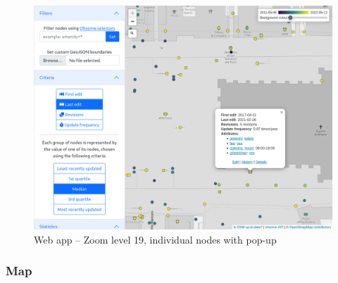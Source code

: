 \documentclass{Configuration_Files/PoliMi3i_thesis}
\begin{document}
\begin{figure}[ht]
    \centering
    \includegraphics[width=1\textwidth]{Images/level19_popup.png}
    \caption{Web app – Zoom level 19, individual nodes with pop-up}
    \label{fig:level19_popup}
\end{figure}

\subsubsection{Map}
\end{document}
